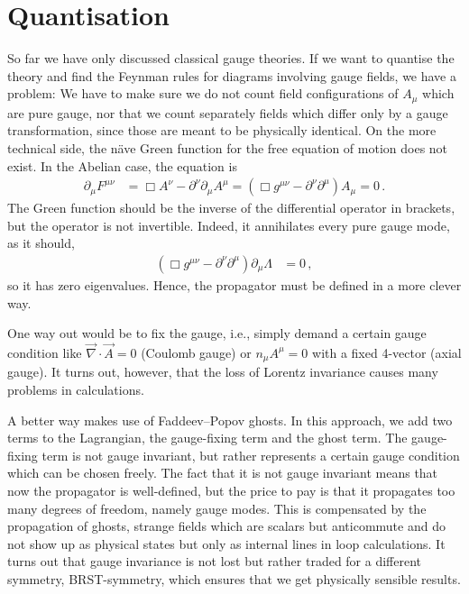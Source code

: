 \documentclass[12pt]{report}
\newcommand{\2}{\ensuremath{\sqrt{2}\,}}
\begin{document}
{    \section{Quantisation}
      So far we have only discussed classical gauge theories. If we want to quantise the theory
      and find the Feynman rules for diagrams involving gauge fields, we have a problem: We have
      to make sure we do not count field configurations of $A_\mu$ which are pure gauge, nor that
      we count separately fields which differ only by a gauge transformation, since those are
      meant to be physically identical. On the more technical side, the na\"{}ve 
      Green function for the free equation of motion does not exist. In the Abelian case, the
      equation is 
      \begin{align}
        \partial_\mu F^{\mu\nu}&=\Box A^\nu -\partial^\nu \partial_\mu A^\mu=\left(\Box g^{\mu\nu}
          -\partial^\nu\partial^\mu\right)A_\mu= 0\,.
      \end{align}
      The Green function should be the inverse of the differential operator in brackets, but the
      operator is not invertible. Indeed, it annihilates every pure gauge mode, as it should,
      \begin{align}
        \left(\Box g^{\mu\nu} -\partial^\nu\partial^\mu\right) \partial_\mu \Lambda &=0\,,
      \end{align}
      so it has zero eigenvalues. Hence, the propagator must be defined in a more clever way.
      
      One way out would be to fix the gauge, i.e., simply demand a certain gauge condition like
      $\vec{\nabla}\cdot \vec{A}=0$ (Coulomb gauge) or $n_\mu
      A^\mu=0$ with a fixed 4-vector (axial gauge). It turns out,
      however, that the loss of Lorentz invariance causes many problems in calculations.
      
      
      A better way makes use of Faddeev--Popov ghosts. In this approach, we add 
      two terms to the Lagrangian, the gauge-fixing term and the ghost term. The gauge-fixing term
      is not gauge invariant, but rather represents a certain gauge condition which can be chosen
      freely. The fact that it is not gauge invariant means that now the propagator is
      well-defined, but the price to pay is that it propagates too many degrees of freedom, namely
      gauge modes. This is compensated by the propagation of ghosts, strange fields which are
      scalars but anticommute and do not show up as physical states but only as internal lines in
      loop calculations.  It turns out that gauge invariance is not lost but rather traded for a
      different symmetry, BRST-symmetry, which ensures that we get physically sensible results.
      
}
\end{document}

